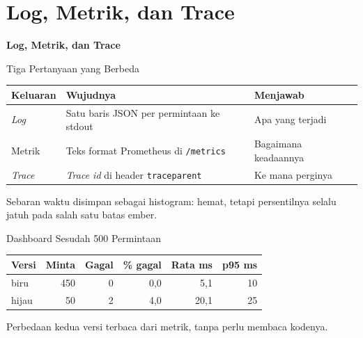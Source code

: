 \documentclass[aspectratio=169, table, 12pt]{beamer}
\begin{document}
\section{Log, Metrik, dan Trace}

\begin{frame}{\hfill}
  \centering
  \Huge{\textbf{Log, Metrik, dan Trace}}
\end{frame}

\begin{frame}{{\Large Tiga Pertanyaan yang Berbeda}}
  \vspace{6pt}
  \centering
  {\footnotesize
  \begin{tabularx}{\textwidth}{lYl}
    \hline
    \textbf{Keluaran} & \textbf{Wujudnya} & \textbf{Menjawab} \\
    \hline
    \textit{Log} & Satu baris JSON per permintaan ke stdout & Apa yang terjadi \\
    \hline
    Metrik & Teks format Prometheus di \texttt{/metrics} & Bagaimana keadaannya \\
    \hline
    \textit{Trace} & \textit{Trace id} di header \texttt{traceparent} & Ke mana perginya \\
    \hline
  \end{tabularx}}

  \vspace{8pt}
  {\small Sebaran waktu disimpan sebagai histogram: hemat, tetapi persentilnya
  selalu jatuh pada salah satu batas ember.}
\end{frame}

\begin{frame}{{\Large Dashboard Sesudah 500 Permintaan}}
  \vspace{6pt}
  \centering
  {\footnotesize
  \begin{tabularx}{\textwidth}{Yrrrrr}
    \hline
    \textbf{Versi} & \textbf{Minta} & \textbf{Gagal} & \textbf{\% gagal} & \textbf{Rata ms} & \textbf{p95 ms} \\
    \hline
    biru & 450 & 0 & 0,0 & 5,1 & 10 \\
    \hline
    hijau & 50 & 2 & 4,0 & 20,1 & 25 \\
    \hline
  \end{tabularx}}

  \vspace{8pt}
  {\small Perbedaan kedua versi terbaca dari metrik, tanpa perlu membaca
  kodenya.}
\end{frame}
\end{document}
